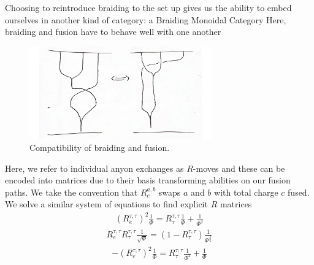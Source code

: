 \documentclass[compress,aspectratio=169,10pt,usenames,dvipsnames]{beamer}
\begin{document}
\begin{frame}
\vfill
Choosing to reintroduce braiding to the set up gives us the ability to embed ourselves in another kind of category: a Braiding Monoidal Category
\vfill
Here, braiding and fusion have to behave well with one another
\begin{figure}[H]
	\centering
	\includegraphics[width=0.7\textwidth]{fusethrubraid.png}
	\caption{Compatibility of braiding and fusion.}
\end{figure}
\vfill
\end{frame}
%
%
\begin{frame}
\vfill
Here, we refer to individual anyon exchanges as $R$-moves and these can be encoded into matrices due to their basis transforming abilities on our fusion paths. We take the convention that $R^{a,b}_c$ swaps $a$ and $b$ with total charge $c$ fused. We solve a similar system of equations to find explicit $R$ matrices
\vfill
\begin{equation}
	\begin{aligned}
		(R^{\tau,\tau}_e)^2\frac{1}{\Phi} = R^{\tau,\tau}_\tau\frac{1}{\Phi} + \frac{1}{\Phi^2}
	\end{aligned}
\end{equation}
\begin{equation}
	\begin{aligned}
		R^{\tau,\tau}_eR^{\tau,\tau}_\tau\frac{1}{\sqrt{\Phi}} = (1-R^{\tau,\tau}_\tau)\frac{1}{\Phi^\frac{3}{2}} 
	\end{aligned}
\end{equation}
\begin{equation}
	\begin{aligned}
		-(R^{\tau,\tau}_e)^2\frac{1}{\Phi} = R^{\tau,\tau}_\tau\frac{1}{\Phi^2}+\frac{1}{\Phi}
	\end{aligned}
\end{equation}
\end{frame}
\end{document}
